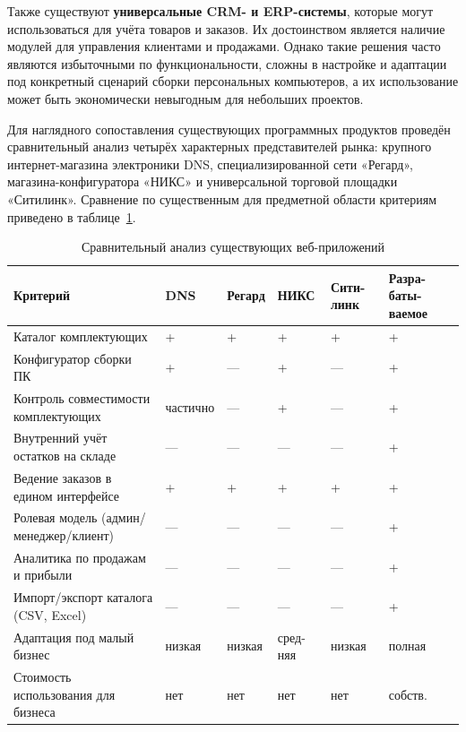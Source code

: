 Также существуют \textbf{универсальные CRM- и ERP-системы}, которые могут использоваться для учёта товаров и заказов. Их достоинством является наличие модулей для управления клиентами и продажами. Однако такие решения часто являются избыточными по функциональности, сложны в настройке и адаптации под конкретный сценарий сборки персональных компьютеров, а их использование может быть экономически невыгодным для небольших проектов.

Для наглядного сопоставления существующих программных продуктов проведён сравнительный анализ четырёх характерных представителей рынка: крупного интернет-магазина электроники DNS, специализированной сети «Регард», магазина-конфигуратора «НИКС» и универсальной торговой площадки «Ситилинк». Сравнение по существенным для предметной области критериям приведено в таблице~\ref{tab:competitors}.

\begin{table}[ht!]
\caption{Сравнительный анализ существующих веб-приложений}
\label{tab:competitors}
\footnotesize
\begin{tabularx}{\textwidth}{|>{\RaggedRight\arraybackslash}p{}|>{\centering\arraybackslash}X|>{\centering\arraybackslash}X|>{\centering\arraybackslash}X|>{\centering\arraybackslash}X|>{\centering\arraybackslash}X|}
\hline
\textbf{Критерий} & \textbf{DNS} & \textbf{Регард} & \textbf{НИКС} & \textbf{Сити-линк} & \textbf{Разра-баты-ваемое} \\ \hline
Каталог комплектующих & + & + & + & + & + \\ \hline
Конфигуратор сборки ПК & + & --- & + & --- & + \\ \hline
Контроль совместимости комплектующих & частично & --- & + & --- & + \\ \hline
Внутренний учёт остатков на складе & --- & --- & --- & --- & + \\ \hline
Ведение заказов в едином интерфейсе & + & + & + & + & + \\ \hline
Ролевая модель (админ/менеджер/клиент) & --- & --- & --- & --- & + \\ \hline
Аналитика по продажам и прибыли & --- & --- & --- & --- & + \\ \hline
Импорт/экспорт каталога (CSV, Excel) & --- & --- & --- & --- & + \\ \hline
Адаптация под малый бизнес & низкая & низкая & сред-няя & низкая & полная \\ \hline
Стоимость использования для бизнеса & нет & нет & нет & нет & собств. \\ \hline
\end{tabularx}
\end{table}

